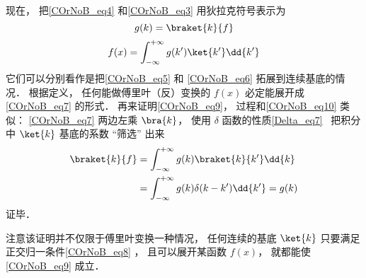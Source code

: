 现在， 把\autoref{COrNoB_eq4}  和\autoref{COrNoB_eq3} 用狄拉克符号表示为
\begin{equation}\label{COrNoB_eq9}
g(k) = \braket{k}{f}
\end{equation}
\begin{equation}\label{COrNoB_eq7}
f(x) = \int_{-\infty}^{+\infty} g(k') \ket{k'} \dd{k'}
\end{equation}
它们可以分别看作是把\autoref{COrNoB_eq5} 和 \autoref{COrNoB_eq6} 拓展到连续基底的情况． 根据定义， 任何能做傅里叶（反）变换的 $f(x)$ 必定能展开成\autoref{COrNoB_eq7} 的形式． 再来证明\autoref{COrNoB_eq9}， 过程和\autoref{COrNoB_eq10} 类似： \autoref{COrNoB_eq7} 两边左乘 $\bra{k}$， 使用 $\delta$ 函数的性质\autoref{Delta_eq7}~ 把积分中 $\ket{k}$ 基底的系数 “筛选” 出来
\begin{equation}
\begin{aligned}
\braket{k}{f} &= \int_{-\infty}^{+\infty} g(k) \braket{k}{k'} \dd{k}\\
&= \int_{-\infty}^{+\infty} g(k) \delta(k-k') \dd{k'}
= g(k)
\end{aligned}
\end{equation}
证毕．

注意该证明并不仅限于傅里叶变换一种情况， 任何连续的基底 $\ket{k}$ 只要满足正交归一条件\autoref{COrNoB_eq8} ， 且可以展开某函数 $f(x)$， 就都能使\autoref{COrNoB_eq9} 成立．

